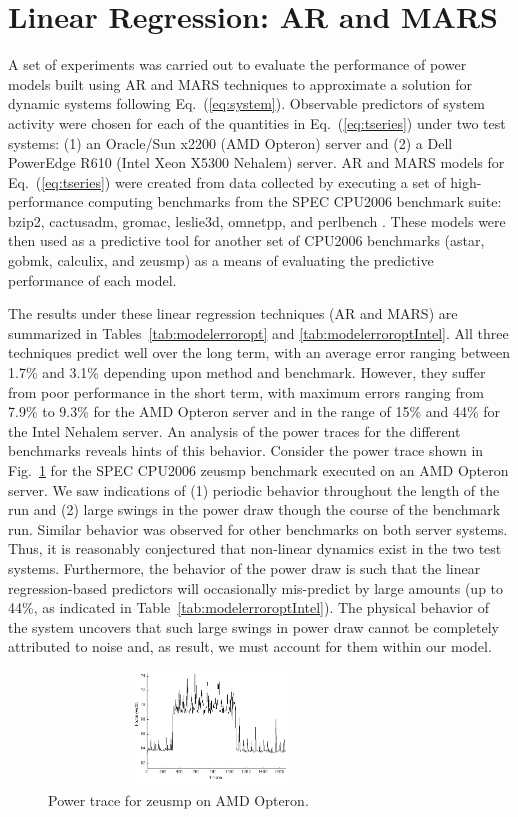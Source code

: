 \documentclass[times,10pt,finalversion]{usetex-v1}
\renewcommand{\figurename}{Fig.}
\begin{document}
\section{Linear Regression: AR and  MARS}
\label{sec:linear}
A set of experiments was carried out to evaluate the performance of
power models built using AR and MARS techniques to approximate a
solution for dynamic systems following Eq.~(\ref{eq:system}). Observable
predictors of system activity were chosen for each of the quantities in
Eq.~(\ref{eq:tseries}) under two test systems: (1) an Oracle/Sun x2200
(AMD Opteron) server and (2) a Dell PowerEdge R610 (Intel Xeon X5300
Nehalem) server.  AR and MARS models for Eq.~(\ref{eq:tseries})
were created from data collected by executing a set of high-performance
computing benchmarks from the SPEC CPU2006 benchmark suite: bzip2,
cactusadm, gromac, leslie3d, omnetpp, and perlbench
\cite{Spec2006}. These models were then used as a predictive tool for
another set of CPU2006 benchmarks (astar, gobmk, calculix, and zeusmp)
as a means of evaluating the predictive performance of each model.

The results under these linear regression techniques (AR and MARS) are
summarized in Tables~\ref{tab:modelerroropt} and
\ref{tab:modelerroroptIntel}. All three techniques predict well over the
long term, with an average error ranging between 1.7\% and 3.1\%
depending upon method and benchmark.  However, they suffer from poor
performance in the short term, with maximum errors ranging from 7.9\% to
9.3\% for the AMD Opteron server and in the range of 15\% and 44\% for
the Intel Nehalem server. An analysis of the power traces for the
different benchmarks reveals hints of this behavior.  Consider the power
trace shown in \figurename~\ref{fig:amdzeusmppwr} for the SPEC CPU2006
zeusmp benchmark executed on an AMD Opteron server.  We saw indications
of (1) periodic behavior throughout the length of the run and (2) large
swings in the power draw though the course of the benchmark run. Similar
behavior was observed for other benchmarks on both server systems.
Thus, it is reasonably conjectured that non-linear dynamics exist in the
two test systems.  Furthermore, the behavior of the power draw is such
that the linear regression-based predictors will occasionally
mis-predict by large amounts (up to 44\%, as indicated in
Table~\ref{tab:modelerroroptIntel}).  The physical behavior of the
system uncovers that such large swings in power draw cannot be
completely attributed to noise and, as result, we must account for them
within our model.
\begin{figure}[bthp]
      \centering
      \includegraphics[width=3.4in,height=1.2in]{amdzeusmppwr2}
      \caption{Power trace for zeusmp on AMD Opteron.}
      \label{fig:amdzeusmppwr}
\end{figure}
\end{document}
